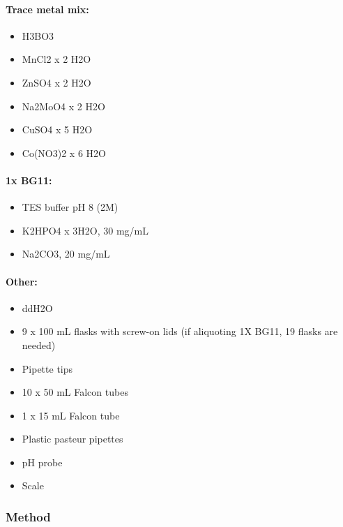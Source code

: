 \paragraph{Trace metal mix:}
\begin{itemize}
    \item H3BO3
    \item MnCl2 x 2 H2O
    \item ZnSO4 x 2 H2O
    \item Na2MoO4 x 2 H2O
    \item CuSO4 x 5 H2O
    \item Co(NO3)2 x 6 H2O
\end{itemize}

\paragraph{1x BG11:}
\begin{itemize}
    \item TES buffer pH 8 (2M)
    \item K2HPO4 x 3H2O, 30 mg/mL 
    \item Na2CO3, 20 mg/mL 
\end{itemize}

\paragraph{Other:}
\begin{itemize}
    \item ddH2O 
    \item 9 x 100 mL flasks with screw-on lids (if aliquoting 1X BG11, 19 flasks are needed)
    \item Pipette tips
    \item 10 x 50 mL Falcon tubes
    \item 1 x 15 mL Falcon tube
    \item Plastic pasteur pipettes
    \item pH probe
    \item Scale
\end{itemize}

\subsubsection{Method}
